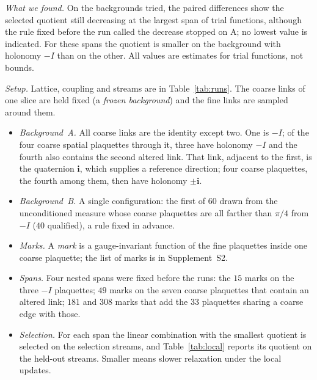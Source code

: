 \emph{What we found.} On the backgrounds tried, the paired differences show the selected quotient still
decreasing at the largest span of trial functions, although the rule fixed before the run called the decrease
stopped on \textsf{A}; no lowest value is indicated. For these spans the quotient is smaller on the background with
holonomy $-I$ than on the other. All values are estimates for trial functions, not bounds.

\emph{Setup.} Lattice, coupling and streams are in Table~\ref{tab:runs}. The coarse links of one slice are
held fixed (a \emph{frozen background}) and the fine links are sampled around them.
\begin{itemize}
\item \emph{Background~\textsf{A}.} All coarse links are the identity except two. One is $-I$; of the four coarse
spatial plaquettes through it, three have holonomy $-I$ and the fourth also contains the second altered link.
That link, adjacent to the first, is the quaternion $\mathbf i$, which supplies a reference direction; four
coarse plaquettes, the fourth among them, then have holonomy $\pm\mathbf i$.
\item \emph{Background~\textsf{B}.} A single configuration: the first of $60$ drawn from the unconditioned measure
whose coarse plaquettes are all farther than $\pi/4$ from $-I$ ($40$ qualified), a rule fixed in advance.
\item \emph{Marks.} A \emph{mark} is a gauge-invariant function of the fine plaquettes inside one coarse
plaquette; the list of marks is in Supplement~S2.
\item \emph{Spans.} Four nested spans were fixed before the runs: the $15$ marks on the three $-I$
plaquettes; $49$ marks on the seven coarse plaquettes that contain an altered link; $181$ and $308$ marks
that add the $33$ plaquettes sharing a coarse edge with those.
\item \emph{Selection.} For each span the linear combination with the smallest quotient is selected on the
selection streams, and Table~\ref{tab:local} reports its quotient on the held-out streams. Smaller means
slower relaxation under the local updates.
\end{itemize}

